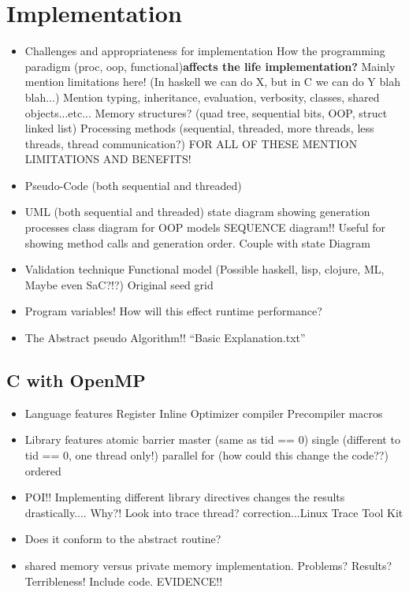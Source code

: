 \documentclass[11pt]{article} %
\begin{document}
\section{Implementation}
\begin{itemize}
\item Challenges and appropriateness for implementation
\subitem How the programming paradigm (proc, oop, functional){\bf affects the life implementation?} Mainly mention limitations here! (In haskell we can do X, but in C we can do Y blah blah...) Mention typing, inheritance, evaluation, verbosity, classes, shared objects...etc...
\subitem Memory structures? (quad tree, sequential bits, OOP, struct linked list)
\subitem Processing methods (sequential, threaded, more threads, less threads, thread communication?)
\subitem FOR ALL OF THESE MENTION LIMITATIONS AND BENEFITS!
\item Pseudo-Code (both sequential and threaded)
\item UML (both sequential and threaded)
\subitem state diagram showing generation processes
\subitem class diagram for OOP models
\subitem SEQUENCE diagram!! Useful for showing method calls and generation order. Couple with state Diagram
\item Validation technique
\subitem Functional model (Possible haskell, lisp, clojure, ML, Maybe even SaC?!?)
\subitem Original seed grid
\item Program variables!
\subitem How will this effect runtime performance?
\item The Abstract pseudo Algorithm!!
\subitem ``Basic Explanation.txt''
\end{itemize}
\subsection{C with OpenMP}
\begin{itemize}
\item Language features
\subitem Register
\subitem Inline
\subitem Optimizer compiler
\subitem Precompiler macros
\item Library features
\subitem atomic
\subitem barrier
\subitem master (same as tid == 0)
\subitem single (different to tid == 0, one thread only!)
\subitem parallel
\subitem for (how could this change the code??)
\subitem ordered
\item POI!! Implementing different library directives changes the results drastically.... Why?! Look into trace thread? correction...Linux Trace Tool Kit
\item Does it conform to the abstract routine?
\item shared memory versus private memory implementation. Problems? Results? Terribleness! Include code. EVIDENCE!!
\end{itemize} 
\end{document}

